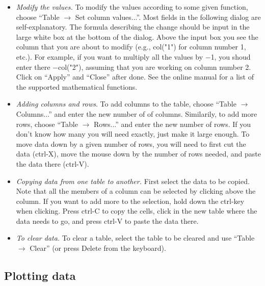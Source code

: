\documentclass[byrevtex,amssymb,aps,pra,floatfix,letterpaper]{revtex4}
\begin{document}
\begin{itemize}
\item \textit{Modify the values.} To modify the values according to some given function, choose ``Table $\rightarrow$ Set column values...''. Most fields in the following dialog are self-explanatory. The formula describing the change should be input in the large white box at the bottom of the dialog. Above the input box you see the column that you are about to modify (e.g., col("1") for column number 1, etc.). For example, if you want to multiply all the values by $-$1, you shoud enter there $-$col("2"), assuming that you are working on column number 2. Click on ``Apply'' and ``Close'' after done. See the online manual for a list of the supported mathematical functions.

\item \textit{Adding columns and rows}. To add columns to the table, choose ``Table $\rightarrow$ Columns...'' and enter the new number of of columns. Similarily, to add more rows, choose ``Table $\rightarrow$ Rows...'' and enter the new number of rows. If you don't know how many you will need exactly, just make it large enough. To move data down by a given number of rows, you will need to first cut the data (ctrl-X), move the mouse down by the number of rows needed, and paste the data there (ctrl-V).

\item \textit{Copying data from one table to another.} First select the data to be copied. Note that all the members of a column can be selected by clicking above the column. If you want to add more to the selection, hold down the ctrl-key when clicking. Press ctrl-C to copy the cells, click in the new table where the data needs to go, and press ctrl-V to paste the data there.

\item \textit{To clear data.} To clear a table, select the table to be cleared and use ``Table $\rightarrow$ Clear'' (or press Delete from the keyboard).

\end{itemize}

\subsection{Plotting data}
\end{document}

